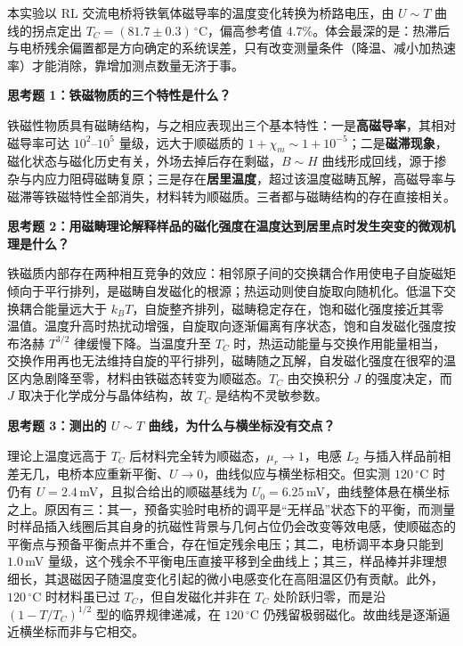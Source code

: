 \documentclass{Phyport}
\begin{document}
本实验以 RL 交流电桥将铁氧体磁导率的温度变化转换为桥路电压，由 $U\sim T$ 曲线的拐点定出 $T_C=(81.7\pm 0.3)\,^\circ$C，偏高参考值 $4.7\%$。体会最深的是：热滞后与电桥残余偏置都是方向确定的系统误差，只有改变测量条件（降温、减小加热速率）才能消除，靠增加测点数量无济于事。

\textbf{思考题 1：铁磁物质的三个特性是什么？}

铁磁性物质具有磁畴结构，与之相应表现出三个基本特性：一是\textbf{高磁导率}，其相对磁导率可达 $10^2$–$10^5$ 量级，远大于顺磁质的 $1+\chi_m\sim 1+10^{-5}$；二是\textbf{磁滞现象}，磁化状态与磁化历史有关，外场去掉后存在剩磁，$B\sim H$ 曲线形成回线，源于掺杂与内应力阻碍磁畴复原；三是存在\textbf{居里温度}，超过该温度磁畴瓦解，高磁导率与磁滞等铁磁特性全部消失，材料转为顺磁质。三者都与磁畴结构的存在直接相关。

\textbf{思考题 2：用磁畴理论解释样品的磁化强度在温度达到居里点时发生突变的微观机理是什么？}

铁磁质内部存在两种相互竞争的效应：相邻原子间的交换耦合作用使电子自旋磁矩倾向于平行排列，是磁畴自发磁化的根源；热运动则使自旋取向随机化。低温下交换耦合能量远大于 $k_BT$，自旋整齐排列，磁畴稳定存在，饱和磁化强度接近其零温值。温度升高时热扰动增强，自旋取向逐渐偏离有序状态，饱和自发磁化强度按布洛赫 $T^{3/2}$ 律缓慢下降。当温度升至 $T_C$ 时，热运动能量与交换作用能量相当，交换作用再也无法维持自旋的平行排列，磁畴随之瓦解，自发磁化强度在很窄的温区内急剧降至零，材料由铁磁态转变为顺磁态。$T_C$ 由交换积分 $J$ 的强度决定，而 $J$ 取决于化学成分与晶体结构，故 $T_C$ 是结构不灵敏参数。

\textbf{思考题 3：测出的 $U\sim T$ 曲线，为什么与横坐标没有交点？}

理论上温度远高于 $T_C$ 后材料完全转为顺磁态，$\mu_r\to 1$，电感 $L_2$ 与插入样品前相差无几，电桥本应重新平衡、$U\to 0$，曲线似应与横坐标相交。但实测 $120\,^\circ$C 时仍有 $U=2.4$\,mV，且拟合给出的顺磁基线为 $U_0=6.25$\,mV，曲线整体悬在横坐标之上。原因有三：其一，预备实验时电桥的调平是“无样品”状态下的平衡，而测量时样品插入线圈后其自身的抗磁性背景与几何占位仍会改变等效电感，使顺磁态的平衡点与预备平衡点并不重合，存在恒定残余电压；其二，电桥调平本身只能到 $1.0$\,mV 量级，这个残余不平衡电压直接平移到全曲线上；其三，样品棒并非理想细长，其退磁因子随温度变化引起的微小电感变化在高阻温区仍有贡献。此外，$120\,^\circ$C 时材料虽已过 $T_C$，但自发磁化并非在 $T_C$ 处阶跃归零，而是沿 $\left(1-T/T_C\right)^{1/2}$ 型的临界规律递减，在 $120\,^\circ$C 仍残留极弱磁化。故曲线是逐渐逼近横坐标而非与它相交。


\end{document}
